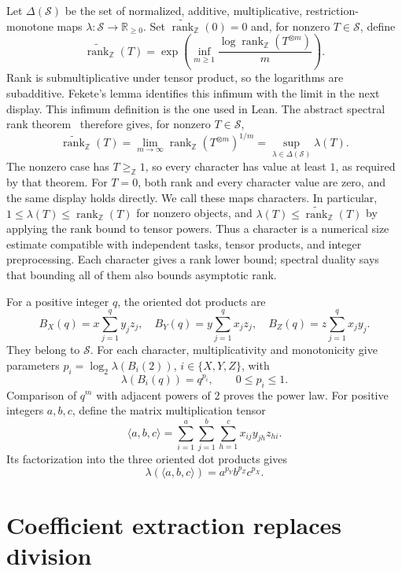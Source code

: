 \documentclass[11pt]{article}
\theoremstyle{remark}
\newcommand{\Z}{\mathbb Z}
\newcommand{\R}{\mathbb R}
\newcommand{\rk}{\operatorname{rank}_{\Z}}
\newcommand{\ark}{\widetilde{\operatorname{rank}}_{\Z}}
\newcommand{\res}{\mathrel{\geq_{\Z}}}
\begin{document}
Let $\Delta(\mathcal S)$ be the set of normalized, additive,
multiplicative, restriction-monotone maps $\lambda:\mathcal S\to\R_{\geq0}$.
Set $\ark(0)=0$ and, for nonzero $T\in\mathcal S$, define
\[
 \ark(T)=\exp\left(\inf_{m\geq1}
                    \frac{\log\rk(T^{\otimes m})}{m}\right).
\]
Rank is submultiplicative under tensor product, so the logarithms are
subadditive. Fekete's lemma identifies this infimum with the limit in
the next display. This infimum definition is the one used in Lean.
The abstract spectral rank theorem~\cite[Theorem 2.13,
Corollary 2.14, Theorem 2.16]{Zui}
therefore gives, for nonzero $T\in\mathcal S$,
\begin{equation}\label{eq:spectrum}
 \ark(T)=\lim_{m\to\infty}\rk(T^{\otimes m})^{1/m}
 =\sup_{\lambda\in\Delta(\mathcal S)}\lambda(T).
\end{equation}
The nonzero case has $T\res1$, so every character has value at least
$1$, as required by that theorem. For $T=0$, both rank and every
character value are zero, and the same display holds directly.
We call these maps characters. In particular,
$1\leq\lambda(T)\leq\rk(T)$ for nonzero objects, and
$\lambda(T)\leq\ark(T)$ by applying the rank bound to tensor powers.
Thus a character is a numerical size estimate compatible with independent
tasks, tensor products, and integer preprocessing. Each character gives
a rank lower bound; spectral duality says that bounding all of them also
bounds asymptotic rank.

For a positive integer $q$, the oriented dot products are
\[
 B_X(q)=x\sum_{j=1}^q y_jz_j,\quad
 B_Y(q)=y\sum_{j=1}^q x_jz_j,\quad
 B_Z(q)=z\sum_{j=1}^q x_jy_j.
\]
They belong to $\mathcal S$. For each character, multiplicativity and
monotonicity give parameters $p_i=\log_2\lambda(B_i(2))$, $i\in\{X,Y,Z\}$,
with
\begin{equation}\label{eq:dot}
 \lambda(B_i(q))=q^{p_i},\qquad 0\leq p_i\leq1.
\end{equation}
Comparison of $q^m$ with adjacent powers of $2$ proves the power law.
For positive integers $a,b,c$, define the matrix multiplication tensor
\[
 \langle a,b,c\rangle=\sum_{i=1}^a\sum_{j=1}^b\sum_{h=1}^c
             x_{ij}y_{jh}z_{hi}.
\]
Its factorization into the three oriented dot products gives
\begin{equation}\label{eq:mm}
 \lambda(\langle a,b,c\rangle)=a^{p_Y}b^{p_Z}c^{p_X}.
\end{equation}

\section{Coefficient extraction replaces division}
\end{document}
